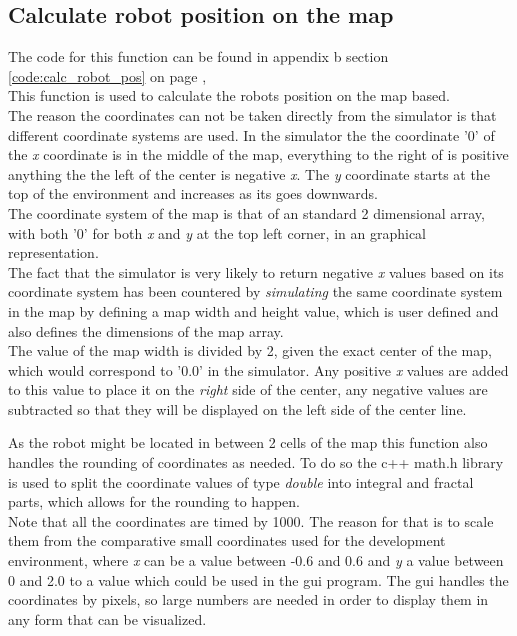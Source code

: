 \subsection{Calculate robot position on the map}
\label{chap3:calc_robot_pos}
The code for this function can be found in appendix b section \ref{code:calc_robot_pos} on page \pageref{code:calc_robot_pos}, \\
This function is used to calculate the robots position on the map based.\\
The reason the coordinates can not be taken directly from the simulator is that different coordinate systems are used. In the simulator the the coordinate '0' of the \textit{x} coordinate is in the middle of the map, everything to the right of is positive anything the the left of the center is negative \textit{x}. The \textit{y} coordinate starts at the top of the environment and increases as its goes downwards. \\
The coordinate system of the map is that of an standard 2 dimensional array, with both '0' for both \textit{x} and \textit{y} at the top left corner, in an graphical representation. \\
The fact that the simulator is very likely to return negative \textit{x} values based on its coordinate system has been countered by \textit{simulating} the same coordinate system in the map by defining a map width and height value, which is user defined and also defines the dimensions of the map array.\\
The value of the map width is divided by 2, given the exact center of the map, which would correspond to '0.0' in the simulator. Any positive \textit{x} values are added to this value to place it on the \textit{right} side of the center, any negative values are subtracted so that they will be displayed on the left side of the center line. 

As the robot might be located in between 2 cells of the map this function also handles the rounding of coordinates as needed. To do so the c++ math.h library is used to split the coordinate values of type \textit{double} into integral and fractal parts, which allows for the rounding to happen. \\
Note that all the coordinates are timed by 1000. The reason for that is to scale them from the comparative small coordinates used for the development environment, where \textit{x} can be a value between -0.6 and 0.6 and \textit{y} a value between 0 and 2.0 to a value which could be used in the gui program. The gui handles the coordinates by pixels, so large numbers are needed in order to display them in any form that can be visualized.\\

